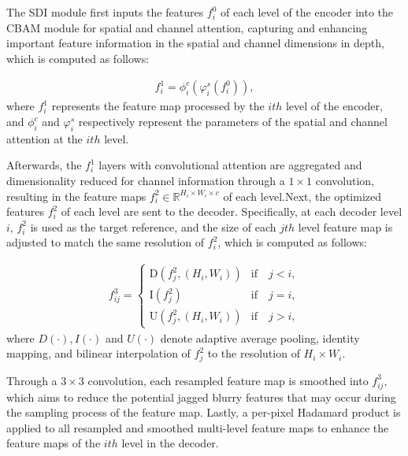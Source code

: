 The SDI module first inputs the features $f_{i}^{0}$ of each level of the encoder into the CBAM module for spatial and channel attention, capturing and enhancing important feature information in the spatial and channel dimensions in depth, which is computed as follows:

\begin{equation}
	\begin{aligned}
		\label{eq:se1}
		f_{i}^{1}=\phi_{i}^{c}(\varphi_{i}^{s}(f_{i}^{0})), 
	\end{aligned}
\end{equation}where $f_{i}^{1}$ represents the feature map processed by the $ith$ level of the encoder, and $\phi_{i}^{c}$ and $\varphi_{i}^{s}$ respectively represent the parameters of the spatial and channel attention at the $ith$ level.


Afterwards, the $f_{i}^{1}$ layers with convolutional attention are aggregated and dimensionality reduced for channel information through a $1 \times 1$ convolution, resulting in the feature maps $f_{i}^{2} \in \mathbb{R}^{H_{i} \times W_{i} \times c}$ of each level.Next, the optimized features $f_{i}^{2}$ of each level are sent to the decoder. Specifically, at each decoder level $i$, $f_{i}^{2}$ is used as the target reference, and the size of each $jth$ level feature map is adjusted to match the same resolution of $f_{i}^{2}$, which is computed as follows:

\begin{equation}
	\begin{aligned}
		\label{eq:se2}
		f_{ij}^3=\begin{cases}\text{D}(f_j^2,(H_i,W_i))&\text{if} \quad j<i,\\\text{I}(f_j^2)&\text{if} \quad j=i,\\\text{U}(f_j^2,(H_i,W_i))&\text{if} \quad j>i,\end{cases}
	\end{aligned}
\end{equation}where $D(\cdot ),I(\cdot )$ and $U(\cdot )$ denote adaptive average pooling, identity mapping, and bilinear interpolation of $f_{j}^{2}$ to the resolution of $H_i \times W_i$.

Through a $3 \times 3$ convolution, each resampled feature map is smoothed into $f_{ij}^{3}$, which aims to reduce the potential jagged blurry features that may occur during the sampling process of the feature map. Lastly, a per-pixel Hadamard product is applied to all resampled and smoothed multi-level feature maps to enhance the feature maps of the $ith$ level in the decoder.

